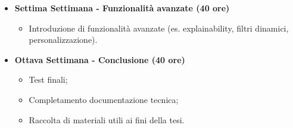 {\begin{itemize}
        \begin{itemize}
            \item Integrazione del prototipo con strumenti aziendali;
            \item UX di base;
            \item Miglioramento del flusso di utilizzo.
        \end{itemize}
        \item \textbf{Settima Settimana - Funzionalità avanzate (40 ore)} 
        \begin{itemize}
            \item Introduzione di funzionalità avanzate (es. explainability, filtri dinamici, personalizzazione).
        \end{itemize}
        \item \textbf{Ottava Settimana - Conclusione (40 ore)} 
        \begin{itemize}
            \item Test finali;
            \item Completamento documentazione tecnica;
            \item Raccolta di materiali utili ai fini della tesi.
        \end{itemize}
    \end{itemize}
}

\newcommand{\totaleOre}{320}

\newcommand{\obiettiviObbligatori}{
	 \item \underline{\textit{O01}}: Acquisizione di competenze pratiche su Oribea/DialogSphere;
	 \item \underline{\textit{O02}}: Connessione a database e gestione dati aziendali o pubblici;
	 \item \underline{\textit{O03}}: Implementazione di un Task AI per l’analisi di bilancio con LLM;
	 \item \underline{\textit{O04}}: Generazione automatica di report con output coerente, chiaro e adattabile;
	 \item \underline{\textit{O05}}: Testing e documentazione completa del prototipo.
	 
}

\newcommand{\obiettiviDesiderabili}{
	 \item \underline{\textit{D01}}: Ottimizzazione del Task AI per performance e scalabilità;
	 \item \underline{\textit{D02}}: Personalizzazione dinamica dei prompt per casi d’uso differenti;
	 \item \underline{\textit{D03}}: Integrazione con strumenti di visualizzazione o interfacce utente.
}

\newcommand{\obiettiviFacoltativi}{
	 \item \underline{\textit{F01}}: Sviluppo di una semplice interfaccia chatbot o dashboard interattiva;
	 \item \underline{\textit{F02}}: Sperimentazione di tecniche di Explainable AI (XAI) per la trasparenza dei risultati;
	 \item \underline{\textit{F03}}: Esportazione automatica dei report in PDF/HTML o invio via e-mail.
}